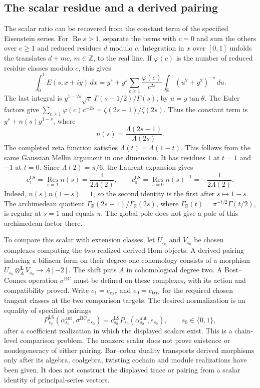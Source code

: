 \subsection{The scalar residue and a derived pairing}
\label{v4-arith:w10-d:prop:koszul-residue}
The scalar ratio can be recovered from the constant term of the
specified Eisenstein series. For $\operatorname{Re}s>1$, separate the
terms with $c=0$ and sum the others over $c\ge1$ and reduced residues
$d$ modulo $c$. Integration in $x$ over $[0,1]$ unfolds the translates
$d+mc$, $m\in\mathbb Z$, to the real line. If $\varphi(c)$ is the number
of reduced residue classes modulo $c$, this gives
\[
 \int_0^1 E(s,x+iy)\,dx
 =y^s+y^s\sum_{c\ge1}\frac{\varphi(c)}{c^{2s}}
           \int_{\mathbb R}(u^2+y^2)^{-s}\,du.
\]
The last integral is
$y^{1-2s}\sqrt\pi\,\Gamma(s-1/2)/\Gamma(s)$, by $u=y\tan\theta$.
The Euler factors give
$\sum_{c\ge1}\varphi(c)c^{-2s}=\zeta(2s-1)/\zeta(2s)$.
Thus the constant term is $y^s+n(s)y^{1-s}$, where
\[
 n(s)=\frac{\Lambda(2s-1)}{\Lambda(2s)}.
\]
The completed zeta function satisfies $\Lambda(t)=\Lambda(1-t)$.
This follows from the same Gaussian Mellin argument in one dimension.
It has residues $1$ at $t=1$ and $-1$ at $t=0$.
Since $\Lambda(2)=\pi/6$, the Laurent expansion gives
\[
 c^{\mathrm{LS}}_1=\operatorname*{Res}_{s=1}n(s)
       =\frac1{2\Lambda(2)},\qquad
 c^{\mathrm{LS}}_0=\operatorname*{Res}_{s=0}n(s)^{-1}
       =-\frac1{2\Lambda(2)}.
\]
Indeed, $n(s)n(1-s)=1$, so the second identity is the first after
$s\mapsto1-s$. The archimedean quotient
$\Gamma_{\mathbb R}(2s-1)/\Gamma_{\mathbb R}(2s)$,
where $\Gamma_{\mathbb R}(t)=\pi^{-t/2}\Gamma(t/2)$,
is regular at $s=1$ and equals $\pi$. The global pole does not give
a pole of this archimedean factor there.

To compare this scalar with extension classes, let $U_{s_0}$ and
$V_{s_0}$ be chosen complexes computing the two realized derived Hom
objects. A derived pairing inducing a bilinear form on their degree-one
cohomology consists of a morphism
$U_{s_0}\otimes_A^{\mathbf L}V_{s_0}\to A[-2]$.
The shift puts $A$ in cohomological degree two.
A Bost--Connes operation $\sigma^{\mathrm{BC}}$ must be defined on
these complexes, with its action and compatibility proved.
Write $e_1=e_{\mathrm{cyc}}$ and $e_0=e_{\mathrm{triv}}$ for the
required chosen tangent classes at the two comparison targets.
The desired normalization is an equality of specified pairings
\begin{equation}\label{v4-arith:w10-d:eq:koszul-residue-pair}
 P^{\mathrm{LS}}_{s_0}
 (\alpha^{\mathrm{aut}}_{s_0},\sigma^{\mathrm{BC}}e_{s_0})
 =c^{\mathrm{LS}}_{s_0}
 P_{s_0}(\alpha^{\mathrm{aut}}_{s_0},e_{s_0}),
 \qquad s_0\in\{0,1\},
\end{equation}
after a coefficient realization in which the displayed scalars exist.
This is a chain-level comparison problem. The nonzero scalar does not
prove existence or nondegeneracy of either pairing.
Bar--cobar duality transports derived morphisms only after its algebra,
coalgebra, twisting cochain and module realizations have been given.
It does not construct the displayed trace or pairing from a scalar
identity of principal-series vectors.

